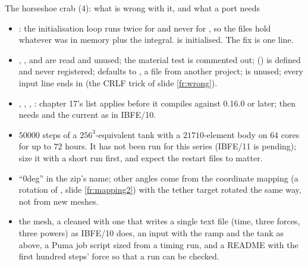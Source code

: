 \documentclass[aspectratio=169,11pt]{beamer}
\begin{document}
\begin{frame}{The horseshoe crab (4): what is wrong with it, and what a port needs}
\label{fr:crab4}
\scriptsize
\begin{itemize}
  \item {}: the initialisation loop runs twice for  and never for , so the  files hold whatever was in memory plus the integral.  is initialised. The fix is one line.
  \item {} , ,  and  are read and unused; the material test is commented out;  () is defined and never registered;  defaults to , a file from another project;  is unused; every input line ends in \code{//} (the CRLF trick of slide \ref{fr:wrong}).
  \item {} , , , : chapter 17's list applies before it compiles against 0.16.0 or later;  then needs  and the current  as in IBFE/10.
  \item {} $50000$ steps of a $256^3$-equivalent tank with a $21710$-element body on $64$ cores for up to $72$ hours. It has not been run for this series (IBFE/11 is pending); size it with a short run first, and expect the restart files to matter.
  \item {} ``$0$deg'' in the zip's name; other angles come from the coordinate mapping (a rotation of , slide \ref{fr:mapping2}) with the tether target rotated the same way, not from new meshes.
  \item {} the mesh, a cleaned  with one  that writes a single text file (time, three forces, three powers) as IBFE/10 does, an input with the ramp and the tank as above, a Puma job script sized from a timing run, and a README with the first hundred steps' force so that a run can be checked.
\end{itemize}
\end{frame}
\end{document}
